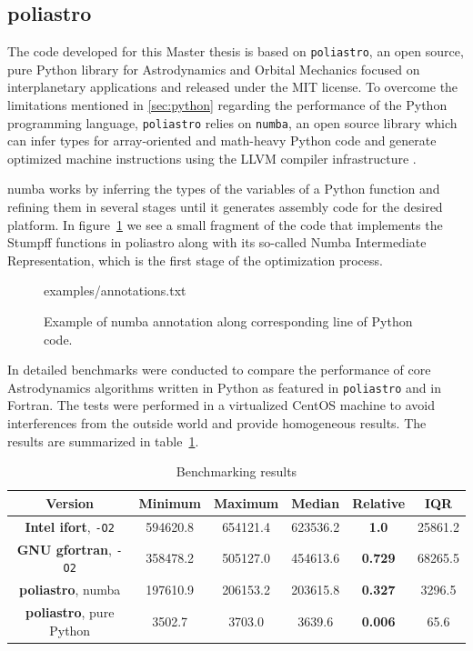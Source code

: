 \subsection{poliastro}

The code developed for this Master thesis is based on \verb|poliastro|, an open source, pure Python library for Astrodynamics and Orbital Mechanics focused on interplanetary applications and released under the MIT license\cite{cano2017poliastro060}. To overcome the limitations mentioned in \ref{sec:python} regarding the performance of the Python programming language, \verb|poliastro| relies on \verb|numba|, an open source library which can infer types for array-oriented and math-heavy Python code and generate optimized machine instructions using the LLVM compiler infrastructure \cite{numba}.

numba works by inferring the types of the variables of a Python function and refining them in several stages until it generates assembly code for the desired platform. In figure~\ref{fig:numba} we see a small fragment of the code that implements the Stumpff functions in poliastro along with its so-called Numba Intermediate Representation, which is the first stage of the optimization process.

\begin{figure}
\begin{lstinputlisting}[language=Python]{examples/annotations.txt}
\end{lstinputlisting}
\caption{Example of numba annotation along corresponding line of Python code.}
\label{fig:numba}
\end{figure}

In \cite{cano2016icatt} detailed benchmarks were conducted to compare the performance of core Astrodynamics algorithms written in Python as featured in \verb|poliastro| and in Fortran. The tests were performed in a virtualized CentOS machine to avoid interferences from the outside world and provide homogeneous results. The results are summarized in table~\ref{table:results}.

\begin{table}
    \centering
    \begin{tabular}{ c|c c c c c }
          \textbf{Version} & \textbf{Minimum} & \textbf{Maximum} & \textbf{Median} & \textbf{Relative} & \textbf{IQR} \\
    \hline
        \textbf{Intel ifort}, \verb|-O2| & 594620.8 & 654121.4 & 623536.2 & \textbf{1.0} & 25861.2 \\ 
        \textbf{GNU gfortran}, \verb|-O2| & 358478.2 & 505127.0 & 454613.6 & \textbf{0.729} & 68265.5 \\ 
        \textbf{poliastro}, numba & 197610.9 & 206153.2 & 203615.8 & \textbf{0.327} & 3296.5 \\ 
        \textbf{poliastro}, pure Python & 3502.7 & 3703.0 & 3639.6 & \textbf{0.006} & 65.6 \\ 
    \end{tabular}
    \caption{Benchmarking results}
    \label{table:results}
\end{table}

